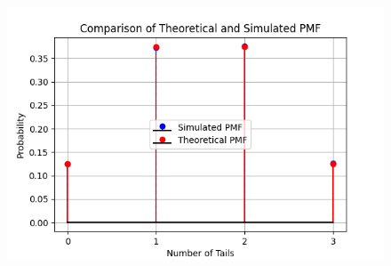 \documentclass[journal]{IEEEtran}
\begin{document}
\begin{figure}[h!]
   \centering
   \includegraphics[width=\columnwidth]{figs/fig4.png}
   \end{figure}
\end{document}
